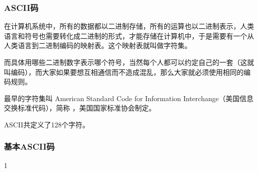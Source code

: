\begin{frame}
    \frametitle{ASCII码}
    在计算机系统中，所有的数据都以二进制存储，所有的运算也以二进制表示，人类语言和符号也需要转化成二进制的形式，才能存储在计算机中，于是需要有一个从人类语言到二进制编码的映射表。这个映射表就叫做字符集。

    而具体用哪些二进制数字表示哪个符号，当然每个人都可以约定自己的一套（这就叫编码），而大家如果要想互相通信而不造成混乱，那么大家就必须使用相同的编码规则。

    最早的字符集叫 American Standard Code for Information Interchange（美国信息交换标准代码），简称 ，美国国家标准协会制定。

    ASCII共定义了128个字符。
\end{frame}

\begin{frame}
    \frametitle{基本ASCII码}
    \begin{spacing}{1}
        \small
\begin{table}[]
        \begin{tabular}{ccccccccc}
        

\end{tabular}
\end{table}
\end{spacing}
\end{frame}
